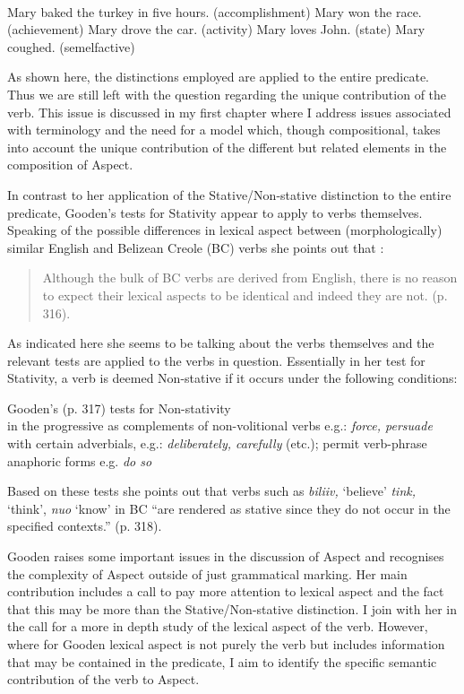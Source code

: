 \ea%
\label{ex:2:23}
\citet[316]{Gooden2008}\\
\ea Mary baked the turkey in five hours. (accomplishment) \ex Mary won
the race. (achievement) \ex Mary drove the car. (activity) \ex Mary
loves John. (state) \ex Mary coughed. (semelfactive) \z \z

As shown here, the distinctions employed are applied to the entire
predicate.  Thus we are still left with the question regarding the
unique contribution of the verb.  This issue is discussed in my first
chapter where I address issues associated with terminology and the
need for a model which, though compositional, takes into account the
unique contribution of the different but related elements in the
composition of Aspect.

In contrast to her application of the Stative\slash Non-stative distinction
to the entire predicate, Gooden’s tests for Stativity appear to apply
to verbs themselves.  Speaking of the possible differences in lexical
aspect between (morphologically) similar English and Belizean Creole (BC) verbs she
points out that :

\begin{quote}
Although the bulk of BC verbs are derived from English, there is no
reason to expect their lexical aspects to be identical and indeed they
are not.  (p. 316).
\end{quote}

As indicated here she seems to be talking about the verbs themselves
and the relevant tests are applied to the verbs in question.
Essentially in her test for Stativity, a verb is deemed Non-stative if
it occurs under the following conditions:

\ea%
\label{ex:2:24}
Gooden’s (p. 317) tests for Non-stativity \\
\ea in the progressive \ex as complements of non-volitional verbs
e.g.: \textit{force, persuade} \ex with certain adverbials, e.g.:
\textit{deliberately, carefully} (etc.); \ex permit verb-phrase
anaphoric forms e.g. \textit{do so} \citep{Mufwene1984} \z \z

Based on these tests she points out that verbs such as
\textit{biliiv,} `believe' \textit{tink,} `think', \textit{nuo}
`know' in BC “are rendered as stative since they do
not occur in the specified contexts.” (p.  318).

Gooden raises some important issues in the discussion of Aspect and
recognises the complexity of Aspect outside of just grammatical
marking.  Her main contribution includes a call to pay more attention
to lexical aspect and the fact that this may be more than the
Stative\slash Non-stative distinction.  I join with her in the call for a
more in depth study of the lexical aspect of the verb.  However, where
for Gooden lexical aspect is not purely the verb but includes
information that may be contained in the predicate, I aim to identify
the specific semantic contribution of the verb to Aspect.

